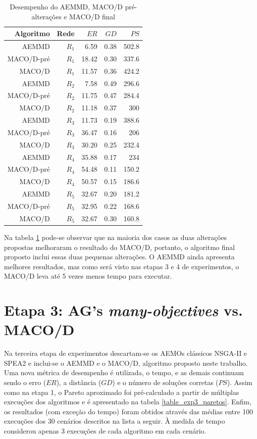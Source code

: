 \begin{table}[!htbp]
	\centering
	\caption{Desempenho do AEMMD, MACO/D pré-alterações e MACO/D final}
	\label{tab_exp2_macod_simples}
	\begin{tabular}{rrrrr}
		Algoritmo  & Rede  & $ER$  & $GD$ & $PS$  \\ \hline
		AEMMD      & $R_1$ & 6.59  & 0.38 & 502.8 \\
		MACO/D-pré & $R_1$ & 18.42 & 0.30 & 337.6 \\
		MACO/D     & $R_1$ & 11.57 & 0.36 & 424.2 \\ \hline
		AEMMD      & $R_2$ & 7.58  & 0.49 & 296.6 \\
		MACO/D-pré & $R_2$ & 11.75 & 0.47 & 284.4 \\
		MACO/D     & $R_2$ & 11.18 & 0.37 & 300   \\ \hline
		AEMMD      & $R_3$ & 11.73 & 0.19 & 388.6 \\
		MACO/D-pré & $R_3$ & 36.47 & 0.16 & 206   \\
		MACO/D     & $R_3$ & 30.20 & 0.25 & 232.4 \\ \hline
		AEMMD      & $R_4$ & 35.88 & 0.17 & 234   \\
		MACO/D-pré & $R_4$ & 54.48 & 0.11 & 150.2 \\
		MACO/D     & $R_4$ & 50.57 & 0.15 & 186.6 \\ \hline
		AEMMD      & $R_5$ & 32.67 & 0.20 & 181.2 \\
		MACO/D-pré & $R_5$ & 32.95 & 0.22 & 168.6 \\
		MACO/D     & $R_5$ & 32.67 & 0.30 & 160.8
	\end{tabular}
\end{table}

Na tabela \ref{tab_exp2_macod_simples} pode-se observar que na maioria dos casos as duas alterações propostas melhoraram o resultado do MACO/D, portanto, o algoritmo final proposto inclui essas duas pequenas alterações. O AEMMD ainda apresenta melhores resultados, mas como será visto nas etapas 3 e 4 de experimentos, o MACO/D leva até 5 vezes menos tempo para executar.

\section{Etapa 3: AG's \textit{many-objectives} vs. MACO/D}

Na terceira etapa de experimentos descartam-se os AEMOs clássicos NSGA-II e SPEA2 e inclui-se o AEMMD e o MACO/D, algoritmo proposto neste trabalho. Uma nova métrica de desempenho é utilizada, o tempo, e as demais continuam sendo o erro ($ER$), a distância ($GD$) e o número de soluções corretas ($PS$). Assim como na etapa 1, o Pareto aproximado foi pré-calculado a partir de múltiplas execuções dos algoritmos e é apresentado na tabela \ref{table_exp3_paretos}. Enfim, os resultados (com exceção do tempo) foram obtidos através das médias entre 100 execuções dos 30 cenários descritos na lista a seguir. À medida de tempo considerou apenas 3 execuções de cada algoritmo em cada cenário.

